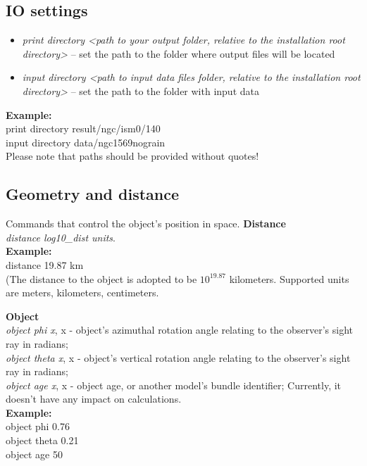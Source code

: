 \documentclass[a4paper]{article}
\begin{document}
\subsection{IO settings}
\begin{itemize}
    \item {\it print directory <path to your output folder, relative to the installation root directory>} -- set the path to the folder where output files will be located \\
    \item {\it input directory <path to input data files folder, relative to the installation root directory>} -- set the path to the folder with input data \\
\end{itemize}
{\bf Example:} \\
print directory result/ngc/ism0/140 \\
input directory data/ngc1569nograin \\
Please note that paths should be provided without quotes!\\

\subsection{Geometry and distance}
Commands that control the object's position in space.
    {\bf Distance}\\
    {\it distance log10\_dist units}.\\

    {\bf Example:}\\
distance 19.87 km \\
(The distance to the object is adopted to be $10^{19.87}$ kilometers.
Supported units are meters, kilometers, centimeters.

    {\bf Object}\\
    {\it object phi x}, x - object's azimuthal rotation angle relating to the observer's sight ray in radians;\\
    {\it object theta x}, x - object's vertical rotation angle relating to the observer's sight ray in radians;\\
    {\it object age x}, x - object age, or another model's bundle identifier; Currently, it doesn't have any impact on calculations.\\

    {\bf Example:}\\
object phi 0.76\\
object theta 0.21\\
object age 50\\
\end{document}
